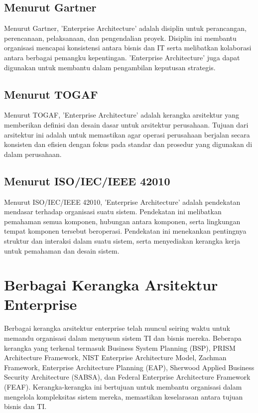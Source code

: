 \subsection{Menurut Gartner}
Menurut Gartner, 'Enterprise Architecture' adalah disiplin untuk perancangan, perencanaan, pelaksanaan, dan pengendalian proyek. Disiplin ini membantu organisasi mencapai konsistensi antara bisnis dan IT serta melibatkan kolaborasi antara berbagai pemangku kepentingan. 'Enterprise Architecture' juga dapat digunakan untuk membantu dalam pengambilan keputusan strategis.

\subsection{Menurut TOGAF}
Menurut TOGAF, 'Enterprise Architecture' adalah kerangka arsitektur yang memberikan definisi dan desain dasar untuk arsitektur perusahaan. Tujuan dari arsitektur ini adalah untuk memastikan agar operasi perusahaan berjalan secara konsisten dan efisien dengan fokus pada standar dan prosedur yang digunakan di dalam perusahaan.

\subsection{Menurut ISO/IEC/IEEE 42010}
Menurut ISO/IEC/IEEE 42010, 'Enterprise Architecture' adalah pendekatan mendasar terhadap organisasi suatu sistem. Pendekatan ini melibatkan pemahaman semua komponen, hubungan antara komponen, serta lingkungan tempat komponen tersebut beroperasi. Pendekatan ini menekankan pentingnya struktur dan interaksi dalam suatu sistem, serta menyediakan kerangka kerja untuk pemahaman dan desain sistem.

\section{Berbagai Kerangka Arsitektur Enterprise}
Berbagai kerangka arsitektur enterprise telah muncul seiring waktu untuk memandu organisasi dalam menyusun sistem TI dan bisnis mereka. Beberapa kerangka yang terkenal termasuk Business System Planning (BSP), PRISM Architecture Framework, NIST Enterprise Architecture Model, Zachman Framework, Enterprise Architecture Planning (EAP), Sherwood Applied Business Security Architecture (SABSA), dan Federal Enterprise Architecture Framework (FEAF). Kerangka-kerangka ini bertujuan untuk membantu organisasi dalam mengelola kompleksitas sistem mereka, memastikan keselarasan antara tujuan bisnis dan TI.


